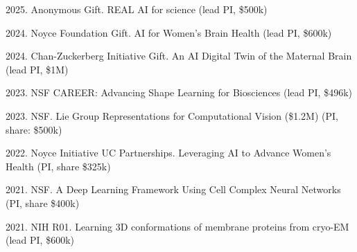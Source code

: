 2025. Anonymous Gift. REAL AI for science \hfill (lead PI, \$500k) 

2024. Noyce Foundation Gift. AI for Women's Brain Health \hfill (lead PI, \$600k) 

2024. Chan-Zuckerberg Initiative Gift. An AI Digital Twin of the Maternal Brain \hfill (lead PI, \$1M) 

2023. NSF CAREER: Advancing Shape Learning for Biosciences \hfill (lead PI, \$496k) 

2023. NSF. Lie Group Representations for Computational Vision (\$1.2M) \hfill (PI, share: \$500k) 

2022. Noyce Initiative UC Partnerships. Leveraging AI to Advance Women’s Health \hfill (PI, share \$325k)

2021. NSF. A Deep Learning Framework Using Cell Complex Neural Networks \hfill (PI, share \$400k)

2021. NIH R01. Learning 3D conformations of membrane proteins from cryo-EM \hfill (lead PI, \$600k) 
